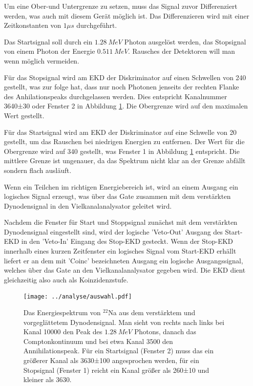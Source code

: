 \documentclass[a4paper,12pt]{article}
\begin{document}
Um eine Ober-und Untergrenze zu setzen, muss das Signal zuvor Differenziert werden,
was auch mit diesem Gerät möglich ist\cite{linearAmplifier}. Das Differenzieren wird mit einer
Zeitkonstanten von $1μs$ durchgeführt.

Das Startsignal soll durch ein $\SI{1.28}{MeV}$ Photon ausgelöst werden, das Stopsignal von einem
Photon der Energie $\SI{0.511}{MeV}$. Rausches der Detektoren will man wenn möglich vermeiden.

Für das Stopsignal wird am EKD der Diskriminator auf einen Schwellen von 240 gestellt, was zur
folge hat, dass nur noch Photonen jenseits der rechten Flanke des Anhilationspeaks durchgelassen
werden. Dies entspricht Kanalnummer 3640±30 oder Fenster 2 in Abbildung \ref{fig:auswahl}. Die
Obergrenze wird auf den maximalen Wert gestellt.

Für das Startsignal wird am EKD der Diskriminator auf eine Schwelle von 20 gestellt, um das Rauschen
bei niedrigen Energien zu entfernen. Der Wert für die Obergrenze wird auf 340 gestellt, was Fenster
1 in Abbildung \ref{fig:auswahl} entspricht.
Die mittlere Grenze ist ungenauer, da das Spektrum nicht klar an der Grenze abfällt sondern flach
ausläuft.

Wenn ein Teilchen im richtigen Energiebereich ist, wird an einem Ausgang ein logisches Signal erzeugt,
was über das Gate zusammen mit dem verstärkten Dynodensignal in den Vielkanalanalysator geleitet wird.

Nachdem die Fenster für Start und Stoppsignal zunächst mit dem verstärkten Dynodensignal eingestellt sind,
wird der logische 'Veto-Out' Ausgang des Start-EKD in den 'Veto-In' Eingang des Stop-EKD gesteckt. Wenn der
Stop-EKD innerhalb eines kurzen Zeitfenster ein logisches Signal vom Start-EKD erhällt liefert er an dem mit
'Coinc' bezeichneten Ausgang ein logische Ausgangssignal, welches über das Gate an den Vielkanalanalysator gegeben wird.
Die EKD dient gleichzeitig also auch als Koinzidenzstufe.


\begin{figure}[h]
	\centering
	\texttt{[image: ../analyse/auswahl.pdf]}
	\caption{Das Energiespektrum von $^{22}$Na aus dem verstärktem und vorgeglättetem
		Dynodensignal.
		Man sieht von rechts nach links bei Kanal 10000 den Peak des $\SI{1.28}{MeV}$ Photons,
		danach das Comptonkontinuum und bei etwa Kanal 3500 den Annihilationspeak.
		Für ein Startsignal (Fenster 2) muss das ein größerer Kanal als 3630±100 angesprochen werden,
		für ein Stopsignal (Fenster 1) reicht ein Kanal größer als 260±10 und kleiner als 3630.}
	\label{fig:auswahl}
\end{figure}
\end{document}
